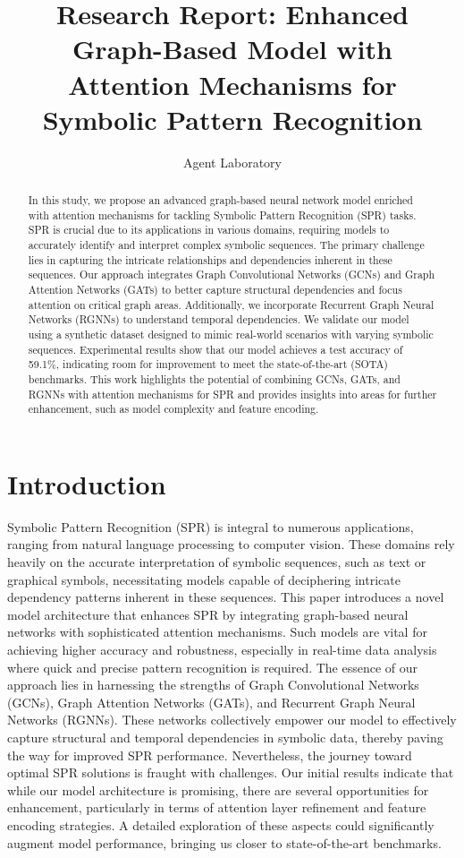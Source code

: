 \documentclass{article}
\title{Research Report: Enhanced Graph-Based Model with Attention Mechanisms for Symbolic Pattern Recognition}
\author{Agent Laboratory}
\begin{document}
\maketitle

\begin{abstract}
In this study, we propose an advanced graph-based neural network model enriched with attention mechanisms for tackling Symbolic Pattern Recognition (SPR) tasks. SPR is crucial due to its applications in various domains, requiring models to accurately identify and interpret complex symbolic sequences. The primary challenge lies in capturing the intricate relationships and dependencies inherent in these sequences. Our approach integrates Graph Convolutional Networks (GCNs) and Graph Attention Networks (GATs) to better capture structural dependencies and focus attention on critical graph areas. Additionally, we incorporate Recurrent Graph Neural Networks (RGNNs) to understand temporal dependencies. We validate our model using a synthetic dataset designed to mimic real-world scenarios with varying symbolic sequences. Experimental results show that our model achieves a test accuracy of 59.1\%, indicating room for improvement to meet the state-of-the-art (SOTA) benchmarks. This work highlights the potential of combining GCNs, GATs, and RGNNs with attention mechanisms for SPR and provides insights into areas for further enhancement, such as model complexity and feature encoding.
\end{abstract}

\section{Introduction}
Symbolic Pattern Recognition (SPR) is integral to numerous applications, ranging from natural language processing to computer vision. These domains rely heavily on the accurate interpretation of symbolic sequences, such as text or graphical symbols, necessitating models capable of deciphering intricate dependency patterns inherent in these sequences. This paper introduces a novel model architecture that enhances SPR by integrating graph-based neural networks with sophisticated attention mechanisms. Such models are vital for achieving higher accuracy and robustness, especially in real-time data analysis where quick and precise pattern recognition is required. The essence of our approach lies in harnessing the strengths of Graph Convolutional Networks (GCNs), Graph Attention Networks (GATs), and Recurrent Graph Neural Networks (RGNNs). These networks collectively empower our model to effectively capture structural and temporal dependencies in symbolic data, thereby paving the way for improved SPR performance. Nevertheless, the journey toward optimal SPR solutions is fraught with challenges. Our initial results indicate that while our model architecture is promising, there are several opportunities for enhancement, particularly in terms of attention layer refinement and feature encoding strategies. A detailed exploration of these aspects could significantly augment model performance, bringing us closer to state-of-the-art benchmarks.
\end{document}

